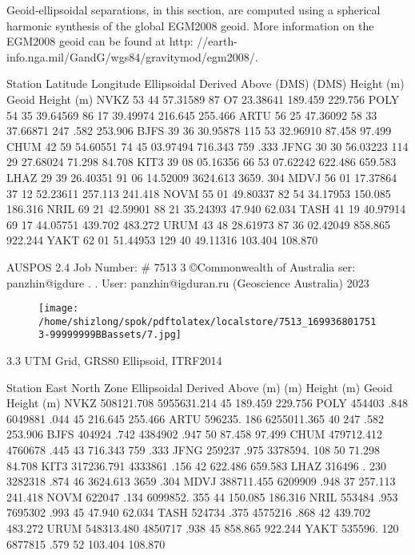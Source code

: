 \documentclass[a4paper,12pt]{article}
\begin{document}
    Geoid-ellipsoidal separations, in this section, are computed using a spherical harmonic  synthesis of the global EGM2008 geoid. More information on the EGM2008 geoid can be  found at http: //earth-info.nga.mil/GandG/wgs84/gravitymod/egm2008/. 

\vspace{10pt}

         Station Latitude Longitude Ellipsoidal Derived Above                   (DMS) (DMS) Height (m) Geoid Height (m)  NVKZ 53 44 57.31589 87 O7 23.38641 189.459 229.756  POLY 54 35 39.64569 86 17 39.49974 216.645 255.466  ARTU 56 25 47.36092 58 33 37.66871 247 .582 253.906  BJFS 39 36 30.95878 115 53 32.96910 87.458 97.499  CHUM 42 59 54.60551 74 45 03.97494 716.343 759 .333  JFNG 30 30 56.03223 114 29 27.68024 71.298 84.708  KIT3 39 08 05.16356 66 53 07.62242 622.486 659.583  LHAZ 29 39 26.40351 91 06 14.52009 3624.613 3659. 304  MDVJ 56 01 17.37864 37 12 52.23611 257.113 241.418  NOVM 55 01 49.80337 82 54 34.17953 150.085 186.316  NRIL 69 21 42.59901 88 21 35.24393 47.940 62.034  TASH 41 19 40.97914 69 17 44.05751 439.702 483.272  URUM 43 48 28.61973 87 36 02.42049 858.865 922.244    YAKT 62 01 51.44953 129 40 49.11316 103.404 108.870     

\vspace{10pt}

         AUSPOS 2.4 Job Number: \# 7513 3 ©Commonwealth of Australia    ser: panzhin@igdure . .  User: panzhin@igduran.ru (Geoscience Australia) 2023 

\vspace{10pt}

\par

\vspace{10pt}

\begin{figure}[h]

\texttt{[image: /home/shizlong/spok/pdftolatex/localstore/7513\_1699368017513-99999999BBassets/7.jpg]}

\centering

\end{figure}

    3.3 UTM Grid, GRS80 Ellipsoid, ITRF2014 

\vspace{10pt}

         Station East North Zone Ellipsoidal Derived Above                   (m) (m) Height (m) Geoid Height (m)  NVKZ 508121.708 5955631.214 45 189.459 229.756  POLY 454403 .848 6049881 .044 45 216.645 255.466  ARTU 596235. 186 6255011.365 40 247 .582 253.906  BJFS 404924 .742 4384902 .947 50 87.458 97.499  CHUM 479712.412 4760678 .445 43 716.343 759 .333  JFNG 259237 .975 3378594. 108 50 71.298 84.708  KIT3 317236.791 4333861 .156 42 622.486 659.583  LHAZ 316496 . 230 3282318 .874 46 3624.613 3659 .304  MDVJ 388711.455 6209909 .948 37 257.113 241.418  NOVM 622047 .134 6099852. 355 44 150.085 186.316  NRIL 553484 .953 7695302 .993 45 47.940 62.034  TASH 524734 .375 4575216 .868 42 439.702 483.272  URUM 548313.480 4850717 .938 45 858.865 922.244    YAKT 535596. 120 6877815 .579 52 103.404 108.870     
\end{document}
